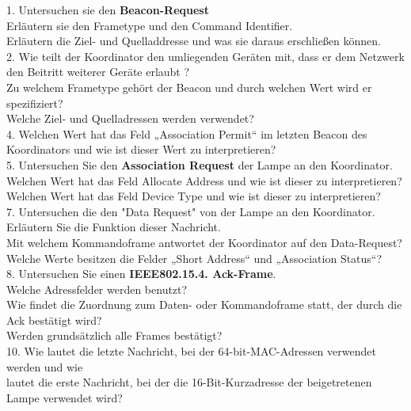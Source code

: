 \begin{Fragen}
    1. Untersuchen sie den \textbf{Beacon-Request}\\
    Erläutern sie den Frametype und den Command Identifier.\\ 
    Erläutern die Ziel- und Quelladdresse und was sie daraus erschließen können.\\
    
    2. Wie teilt der Koordinator den umliegenden Geräten mit, dass er dem Netzwerk den Beitritt weiterer Geräte erlaubt ?\\
    Zu welchem Frametype gehört der Beacon und durch welchen Wert wird er spezifiziert?\\
    Welche Ziel- und Quelladressen werden verwendet?\\
    
    4. Welchen Wert hat das Feld „Association Permit“ im letzten Beacon des Koordinators und wie ist dieser Wert zu interpretieren? \\
    
    5. Untersuchen Sie den \textbf{Association Request} der Lampe an den Koordinator. \\
    Welchen Wert hat das Feld \grqq Allocate Address \grqq{} und wie ist dieser zu interpretieren?\\
    Welchen Wert hat das Feld \grqq Device Type\grqq{} und wie ist dieser zu interpretieren?\\
    
    7. Untersuchen die den "Data Request" von der Lampe an den Koordinator.\\
    Erläutern Sie die Funktion dieser Nachricht.\\
    Mit welchem Kommandoframe antwortet der Koordinator auf den Data-Request?\\
    Welche Werte besitzen die Felder „Short Address“ und „Association Status“?\\
    
    8. Untersuchen Sie einen \textbf{IEEE802.15.4. Ack-Frame}.\\
    Welche Adressfelder werden benutzt? \\
    Wie findet die Zuordnung zum Daten- oder Kommandoframe statt, der durch die Ack bestätigt wird? \\
    Werden grundsätzlich alle Frames bestätigt?\\
    
    10. Wie lautet die letzte Nachricht, bei der 64-bit-MAC-Adressen verwendet werden und wie\\
     lautet die erste Nachricht, bei der die 16-Bit-Kurzadresse der beigetretenen Lampe verwendet wird?\\
    

\end{Fragen}
